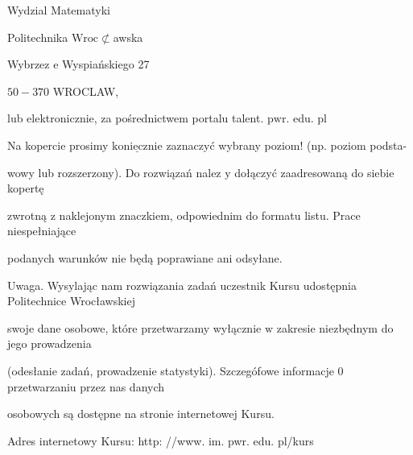 \documentclass[a4paper,12pt]{article}
\begin{document}
Wydzial Matematyki

Politechnika $\mathrm{W}\mathrm{r}\mathrm{o}\mathrm{c}\not\subset$awska

Wybrzez $\mathrm{e}$ Wyspiańskiego 27

$50-370$ WROCLAW,

lub elektronicznie, za pośrednictwem portalu talent. $\mathrm{p}\mathrm{w}\mathrm{r}$. edu. pl

Na kopercie prosimy $\underline{\mathrm{k}\mathrm{o}\mathrm{n}\mathrm{i}\mathrm{e}\mathrm{c}\mathrm{z}\mathrm{n}\mathrm{i}\mathrm{e}}$ zaznaczyć wybrany poziom! (np. poziom podsta-

wowy lub rozszerzony). Do rozwiązań nalez $\mathrm{y}$ dołączyć zaadresowaną do siebie kopertę

zwrotną $\mathrm{z}$ naklejonym znaczkiem, odpowiednim do formatu listu. Prace niespełniające

podanych warunków nie będą poprawiane ani odsyłane.

Uwaga. Wysylając nam rozwiązania zadań uczestnik Kursu udostępnia Politechnice Wrocławskiej

swoje dane osobowe, które przetwarzamy wyłącznie $\mathrm{w}$ zakresie niezbędnym do jego prowadzenia

(odesłanie zadań, prowadzenie statystyki). Szczegófowe informacje $0$ przetwarzaniu przez nas danych

osobowych są dostępne na stronie internetowej Kursu.

Adres internetowy Kursu: http: //www. im. pwr. edu. pl/kurs
\end{document}
